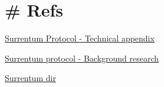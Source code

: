 \documentclass[11pt, reqno]{amsart}
\begin{document}
\hypertarget{refs}{%
\section{\# Refs}\label{refs}}

\href{https://docs.google.com/document/d/1Jp_yPU1FXFF7TdQjLiWzPzTLZmRLJ3KX0dooxArMQeI/edit}{\ul{Surrentum
Protocol - Technical appendix}}

\href{https://docs.google.com/document/d/170IAWtrPUmMGXER-yIEFQ5zaArh2ksRNfvzciF6FLe0/edit\#}{\ul{Surrentum
protocol - Background research}}

\href{https://drive.google.com/drive/u/1/folders/1icv3ifB095AIOMWtgr91v7mfR7Y7KaEl}{\ul{Surrentum
dir}}
\end{document}
